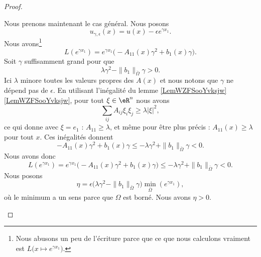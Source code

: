 \begin{proof}
\begin{subproof}
            Nous prenons maintenant le cas général. Nous posons
            \begin{equation}
                u_{\gamma,\epsilon}(x)=u(x)-\epsilon e^{\gamma x_1}.
            \end{equation}
            Nous avons\footnote{Nous abusons un peu de l'écriture parce que ce que nous calculons vraiment est \( L\big( x\mapsto  e^{\gamma x_1} \big)\).}
            \begin{equation}
                L( e^{\gamma x_1})= e^{\gamma x_1}\big( -A_{11}(x)\gamma^2+b_1(x)\gamma \big).
            \end{equation}
            Soit \( \gamma\) suffisamment grand pour que
            \begin{equation}
                \lambda\gamma^2-\| b_1 \|_{\bar \Omega}\gamma>0.
            \end{equation}
            Ici \( \lambda\) minore toutes les valeurs propres des \( A(x)\) et nous notons que \( \gamma\) ne dépend pas de \( \epsilon\). En utilisant l'inégalité du lemme \ref{LemWZFSooYvksjw}\ref{LemWZFSooYvksjw}, pour tout \( \xi\in \eR^n\) nous avons
            \begin{equation}
                \sum_{ij}A_{ij}\xi_i\xi_j\geq \lambda| \xi |^2,
            \end{equation}
            ce qui donne avec \( \xi=e_1\) : \( A_{11}\geq \lambda\), et même pour être plus précis : \( A_{11}(x)\geq \lambda\) pour tout \( x\). Ces inégalités donnent
            \begin{equation}
                -A_{11}(x)\gamma^2+b_1(x)\gamma\leq -\lambda\gamma^2+\| b_1 \|_{\bar \Omega}\gamma<0.
            \end{equation}
            Nous avons donc
            \begin{equation}        \label{EQooXCGQooLGMnvL}
                L( e^{\gamma x_1})= e^{\gamma x_1}\big( -A_{11}(x)\gamma^2+b_1(x)\gamma \big)\leq  -\lambda\gamma^2+\| b_1 \|_{\bar \Omega}\gamma<0.
            \end{equation}
            Nous posons
            \begin{equation}
                \eta=\epsilon\big( \lambda\gamma^2-\| b_1 \|_{\bar\Omega}\gamma \big)\min_{\bar \Omega}( e^{\gamma x_1}),
            \end{equation}
            où le minimum a un sens parce que \( \Omega\) est borné. Nous avons \( \eta>0\).


\end{subproof}
\end{proof}
